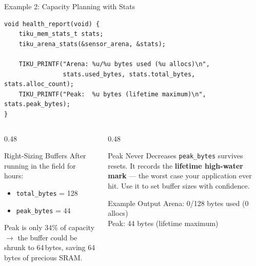 \documentclass[aspectratio=169, 10pt]{beamer}
\begin{document}
\begin{frame}[fragile]{Example 2: Capacity Planning with Stats}
\begin{lstlisting}[style=cstyle]
void health_report(void) {
    tiku_mem_stats_t stats;
    tiku_arena_stats(&sensor_arena, &stats);

    TIKU_PRINTF("Arena: %u/%u bytes used (%u allocs)\n",
                stats.used_bytes, stats.total_bytes, stats.alloc_count);
    TIKU_PRINTF("Peak:  %u bytes (lifetime maximum)\n", stats.peak_bytes);
}
\end{lstlisting}

\vspace{0.3em}
\begin{columns}[T]
\begin{column}{0.48\textwidth}
\begin{block}{Right-Sizing Buffers}
After running in the field for hours:
\begin{itemize}
  \item \texttt{total\_bytes} = 128
  \item \texttt{peak\_bytes} = 44
\end{itemize}
Peak is only 34\% of capacity $\rightarrow$ the buffer could be
shrunk to 64\,bytes, saving 64\,bytes of precious SRAM.
\end{block}
\end{column}
\begin{column}{0.48\textwidth}
\begin{alertblock}{Peak Never Decreases}
\texttt{peak\_bytes} survives resets. It records the \textbf{lifetime
high-water mark} --- the worst case your application ever hit.
Use it to set buffer sizes with confidence.
\end{alertblock}

\vspace{0.3em}
\begin{block}{Example Output}
\small\ttfamily
Arena: 0/128 bytes used (0 allocs)\\
Peak:  44 bytes (lifetime maximum)
\end{block}
\end{column}
\end{columns}
\end{frame}
\end{document}
